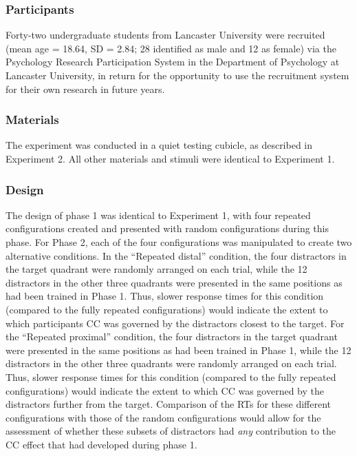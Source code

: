 \documentclass[
  man,floatsintext]{apa7}
\begin{document}
\hypertarget{participants-2}{%
\subsubsection{Participants}\label{participants-2}}

Forty-two undergraduate students from Lancaster University were recruited (mean age = 18.64, SD = 2.84; 28 identified as male and 12 as female) via the Psychology Research Participation System in the Department of Psychology at Lancaster University, in return for the opportunity to use the recruitment system for their own research in future years.

\hypertarget{materials-2}{%
\subsubsection{Materials}\label{materials-2}}

The experiment was conducted in a quiet testing cubicle, as described in Experiment 2. All other materials and stimuli were identical to Experiment 1.

\hypertarget{design-2}{%
\subsubsection{Design}\label{design-2}}

The design of phase 1 was identical to Experiment 1, with four repeated configurations created and presented with random configurations during this phase. For Phase 2, each of the four configurations was manipulated to create two alternative conditions. In the ``Repeated distal'' condition, the four distractors in the target quadrant were randomly arranged on each trial, while the 12 distractors in the other three quadrants were presented in the same positions as had been trained in Phase 1. Thus, slower response times for this condition (compared to the fully repeated configurations) would indicate the extent to which participants CC was governed by the distractors closest to the target. For the ``Repeated proximal'' condition, the four distractors in the target quadrant were presented in the same positions as had been trained in Phase 1, while the 12 distractors in the other three quadrants were randomly arranged on each trial. Thus, slower response times for this condition (compared to the fully repeated configurations) would indicate the extent to which CC was governed by the distractors further from the target. Comparison of the RTs for these different configurations with those of the random configurations would allow for the assessment of whether these subsets of distractors had \emph{any} contribution to the CC effect that had developed during phase 1.
\end{document}
